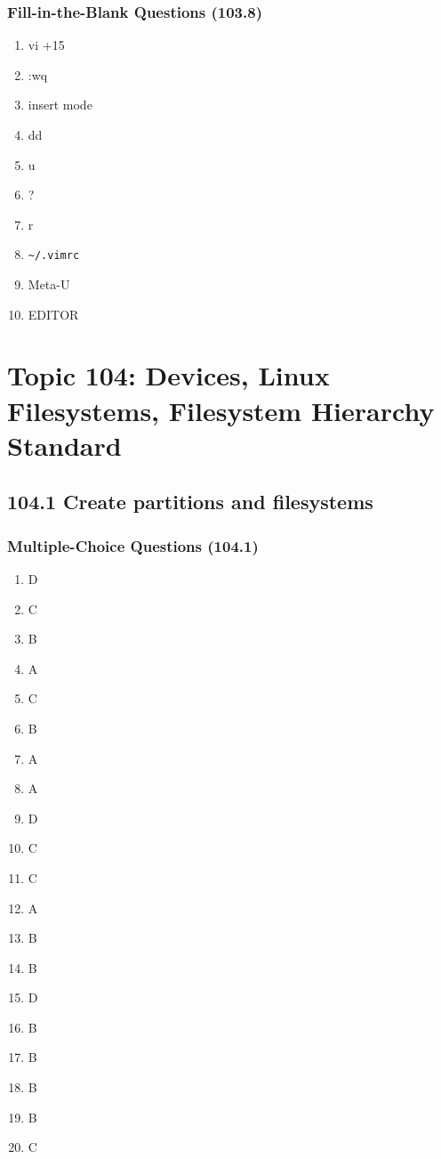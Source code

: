 \documentclass[a4paper]{report}
\begin{document}
\subsubsection*{Fill-in-the-Blank Questions (103.8)}
\begin{enumerate}[1.]
    \item vi +15
    \item :wq
    \item insert mode
    \item dd
    \item u
    \item ?
    \item r
    \item \texttt{\textasciitilde/.vimrc}
    \item Meta-U
    \item EDITOR
\end{enumerate}

\section*{Topic 104: Devices, Linux Filesystems, Filesystem Hierarchy Standard}

\subsection*{104.1 Create partitions and filesystems}
\subsubsection*{Multiple-Choice Questions (104.1)}
\begin{enumerate}[1.]
    \item D
    \item C
    \item B
    \item A
    \item C
    \item B
    \item A
    \item A
    \item D
    \item C
    \item C
    \item A
    \item B
    \item B
    \item D
    \item B
    \item B
    \item B
    \item B
    \item C
\end{enumerate}
\end{document}

